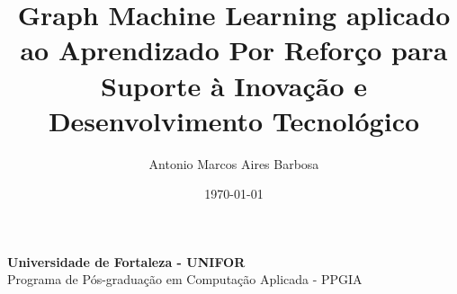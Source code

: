 \documentclass{article}
\begin{document}
\begin{titlepage}
    \centering
    \vspace*{1cm} %
    {\large \textbf{Universidade de Fortaleza - UNIFOR}\\ Programa de Pós-graduação em Computação Aplicada - PPGIA}
      
    \title{Graph Machine Learning aplicado ao Aprendizado Por Reforço para Suporte à Inovação e Desenvolvimento Tecnológico}
    
    \vspace*{4cm} %
    \author{Antonio Marcos Aires Barbosa} %

    \date{\today}
\end{titlepage}

\maketitle

\clearpage
\tableofcontents

\clearpage
{} %












\end{document}
